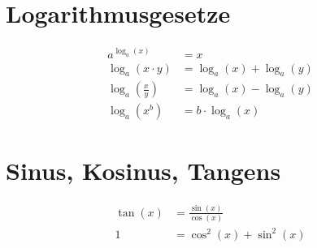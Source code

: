 \documentclass{article}
\begin{document}
\begin{multicols}{2}
\section*{Logarithmusgesetze}

\begin{align*}
	a^{\log_a(x)} &= x \\
	\log_a (x \cdot y) &= \log_a (x) + \log_a (y) \\
	\log_a \left( \frac{x}{y} \right) &= \log_a (x) - \log_a (y) \\
	\log_a (x^b) &= b \cdot \log_a (x)
\end{align*}

\section*{Sinus, Kosinus, Tangens}

\begin{align*}
	\tan(x) &= \frac{\sin(x)}{\cos(x)} \\
	1 &= \cos^2(x) + \sin^2(x)
\end{align*}

\end{multicols}
\end{document}
